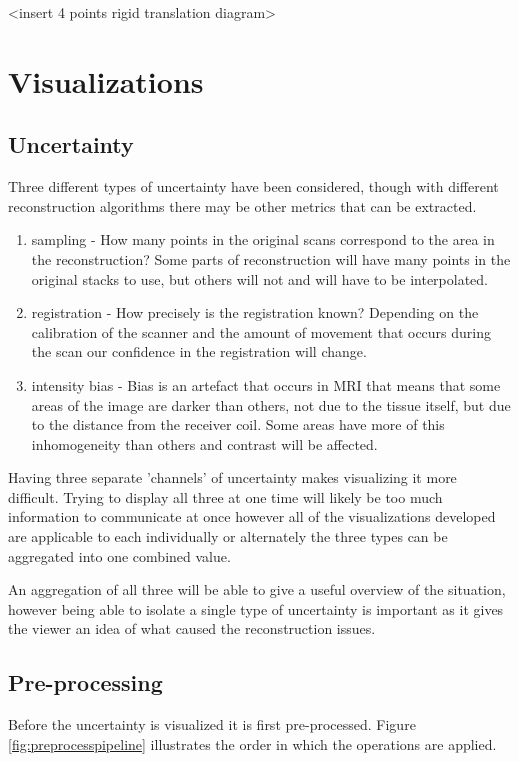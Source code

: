 <insert 4 points rigid translation diagram>

\clearpage
\section{Visualizations}

\subsection{Uncertainty}\label{method:uncertainty}
Three different types of uncertainty have been considered, though with different reconstruction algorithms there may be other metrics that can be extracted.

\begin{enumerate}
  \item sampling - How many points in the original scans correspond to the area in the reconstruction? Some parts of reconstruction will have many points in the original stacks to use, but others will not and will have to be interpolated.
  \item registration - How precisely is the registration known? Depending on the calibration of the scanner and the amount of movement that occurs during the scan our confidence in the registration will change.
  \item intensity bias - Bias is an artefact that occurs in MRI that means that some areas of the image are darker than others, not due to the tissue itself, but due to the distance from the receiver coil. Some areas have more of this inhomogeneity than others and contrast will be affected.
\end{enumerate}

Having three separate 'channels' of uncertainty makes visualizing it more difficult. Trying to display all three at one time will likely be too much information to communicate at once however all of the visualizations developed are applicable to each individually or alternately the three types can be aggregated into one combined value.

An aggregation of all three will be able to give a useful overview of the situation, however being able to isolate a single type of uncertainty is important as it gives the viewer an idea of what caused the reconstruction issues.

\subsection{Pre-processing}
Before the uncertainty is visualized it is first pre-processed. Figure \ref{fig:preprocesspipeline} illustrates the order in which the operations are applied.

